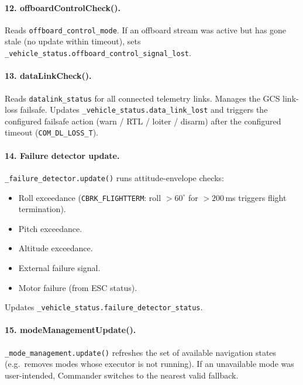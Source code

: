 \documentclass[12pt,a4paper]{article}
\begin{document}
\paragraph{12. offboardControlCheck().}
Reads \texttt{offboard\_control\_mode}.
If an offboard stream was active but has gone stale (no update within timeout),
sets \texttt{\_vehicle\_status.offboard\_control\_signal\_lost}.

\paragraph{13. dataLinkCheck().}
Reads \texttt{datalink\_status} for all connected telemetry links.
Manages the GCS link-loss failsafe.
Updates \texttt{\_vehicle\_status.data\_link\_lost} and triggers the
configured failsafe action (warn / RTL / loiter / disarm) after the
configured timeout (\texttt{COM\_DL\_LOSS\_T}).

\paragraph{14. Failure detector update.}
\texttt{\_failure\_detector.update()} runs attitude-envelope checks:
\begin{itemize}
  \item Roll exceedance (\texttt{CBRK\_FLIGHTTERM}: roll $> 60^{\circ}$ for $> 200$\,ms
        triggers flight termination).
  \item Pitch exceedance.
  \item Altitude exceedance.
  \item External failure signal.
  \item Motor failure (from ESC status).
\end{itemize}
Updates \texttt{\_vehicle\_status.failure\_detector\_status}.

\paragraph{15. modeManagementUpdate().}
\texttt{\_mode\_management.update()} refreshes the set of available navigation
states (e.g.\ removes modes whose executor is not running).
If an unavailable mode was user-intended, Commander switches to the
nearest valid fallback.
\end{document}
